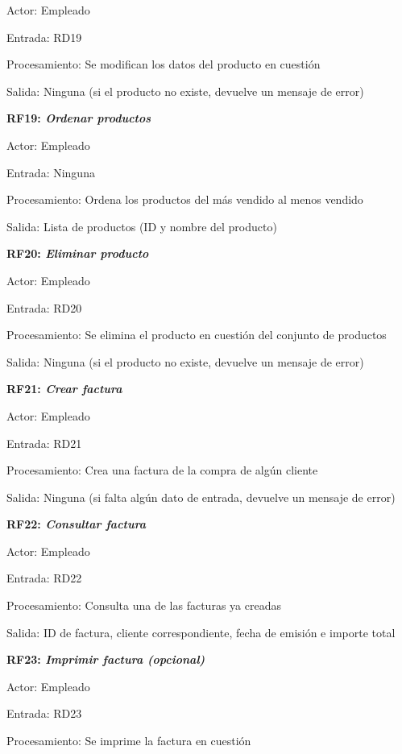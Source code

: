 \documentclass[paper=a4, fontsize=11pt, spanish]{scrartcl}
\begin{document}
	Actor: Empleado
	
	Entrada: RD19
	
	Procesamiento: Se modifican los datos del producto en cuestión
	
	Salida: Ninguna (si el producto no existe, devuelve un mensaje de error)
	
	\setlength{\parindent}{0em}
	\textbf{RF19: \textit{Ordenar productos}}
	\setlength{\parindent}{2em}
	
	Actor: Empleado
	
	Entrada: Ninguna
	
	Procesamiento: Ordena los productos del más vendido al menos vendido
	
	Salida: Lista de productos (ID y nombre del producto)
	
	\setlength{\parindent}{0em}
	\textbf{RF20: \textit{Eliminar producto}}
	\setlength{\parindent}{2em}
	
	Actor: Empleado
	
	Entrada: RD20
	
	Procesamiento: Se elimina el producto en cuestión del conjunto de productos 
	
	Salida: Ninguna (si el producto no existe, devuelve un mensaje de error)
	
	\setlength{\parindent}{0em}
	\textbf{RF21: \textit{Crear factura}}
	\setlength{\parindent}{2em}
	
	Actor: Empleado
	
	Entrada: RD21
	
	Procesamiento: Crea una factura de la compra de algún cliente 
	
	Salida: Ninguna (si falta algún dato de entrada, devuelve un mensaje de error)
	
	\setlength{\parindent}{0em}
	\textbf{RF22: \textit{Consultar factura}}
	\setlength{\parindent}{2em}
	
	Actor: Empleado
	
	Entrada: RD22
	
	Procesamiento: Consulta una de las facturas ya creadas 
	
	Salida: ID de factura, cliente correspondiente, fecha de emisión e importe total
	
	\setlength{\parindent}{0em}
	\textbf{RF23: \textit{Imprimir factura (opcional)}}
	\setlength{\parindent}{2em}
	
	Actor: Empleado
	
	Entrada: RD23
	
	Procesamiento: Se imprime la factura en cuestión
	
\end{document}

